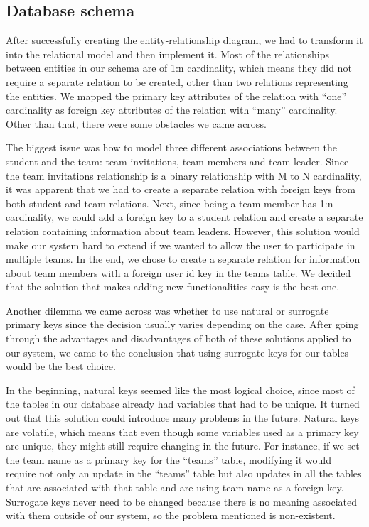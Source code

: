 \subsection{Database schema}
After successfully creating the entity-relationship diagram, we had to transform it into the relational model and then implement it. Most of the relationships between entities in our schema are of 1:n cardinality, which means they did not require a separate relation to be created, other than two relations representing the entities. We mapped the primary key attributes of the relation with ``one'' cardinality as foreign key attributes of the relation with ``many'' cardinality. Other than that, there were some obstacles we came across. 

The biggest issue was how to model three different associations between the student and the team: team invitations, team members and team leader. Since the team invitations relationship is a binary relationship with M to N cardinality, it was apparent that we had to create a separate relation with foreign keys from both student and team relations. Next, since being a team member has 1:n cardinality, we could add a foreign key to a student relation and create a separate relation containing information about team leaders. However, this solution would make our system hard to extend if we wanted to allow the user to participate in multiple teams. In the end, we chose to create a separate relation for information about team members with a foreign user id key in the teams table. We decided that the solution that makes adding new functionalities easy is the best one. 

Another dilemma we came across was whether to use natural or surrogate primary keys since the decision usually varies depending on the case. After going through the advantages and disadvantages of both of these solutions applied to our system, we came to the conclusion that using surrogate keys for our tables would be the best choice.

In the beginning, natural keys seemed like the most logical choice, since most of the tables in our database already had variables that had to be unique. It turned out that this solution could introduce many problems in the future. Natural keys are volatile, which means that even though some variables used as a primary key are unique, they might still require changing in the future. For instance, if we set the team name as a primary key for the ``teams'' table, modifying it would require not only an update in the ``teams'' table but also updates in all the tables that are associated with that table and are using team name as a foreign key. Surrogate keys never need to be changed because there is no meaning associated with them outside of our system, so the problem mentioned is non-existent.

